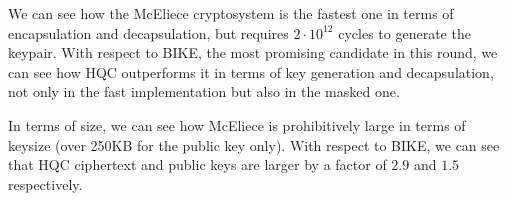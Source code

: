     
    We can see how the McEliece cryptosystem is the fastest one in terms of encapsulation and decapsulation, but 
    requires $2\cdot 10^{12}$ cycles to generate the keypair. With respect to BIKE, the most promising
    candidate in this round, we can see how HQC outperforms it in terms of key generation and decapsulation,
    not only in the fast implementation but also in the masked one.


    In terms of size, we can see how McEliece is prohibitively large in terms of keysize (over 250KB for the public key only).
    With respect to BIKE, we can see that HQC ciphertext and public keys are larger by a factor of $2.9$ and $1.5$ respectively.

    
